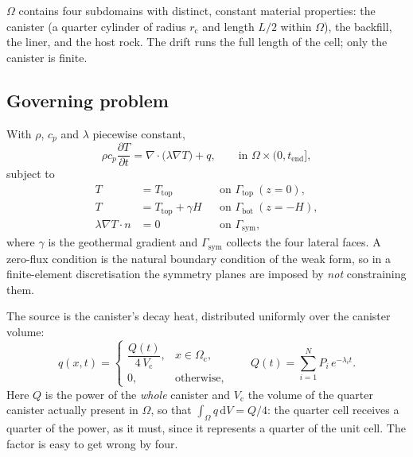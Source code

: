 \documentclass[11pt,a4paper]{article}
\theoremstyle{plain}
\newcommand{\Ttop}{T_{\mathrm{top}}}
\newcommand{\dd}{\,\mathrm{d}}
\begin{document}
$\Omega$ contains four subdomains with distinct, constant material properties:
the canister (a quarter cylinder of radius $r_{\mathrm{c}}$ and length $L/2$
within $\Omega$), the backfill, the liner, and the host rock. The drift runs the
full length of the cell; only the canister is finite.

\subsection{Governing problem}

With $\rho$, $c_p$ and $\lambda$ piecewise constant,
\begin{equation}
  \rho c_p \frac{\partial T}{\partial t}
    = \nabla\cdot\bigl(\lambda \nabla T\bigr) + q,
  \qquad \text{in } \Omega \times (0, t_{\mathrm{end}}],
  \label{eq:heat}
\end{equation}
subject to
\begin{equation}
  \begin{aligned}
    T &= \Ttop                  && \text{on } \Gamma_{\mathrm{top}} \ (z = 0),\\
    T &= \Ttop + \gamma H       && \text{on } \Gamma_{\mathrm{bot}} \ (z = -H),\\
    \lambda \nabla T \cdot n &= 0 && \text{on } \Gamma_{\mathrm{sym}},
  \end{aligned}
  \label{eq:bc}
\end{equation}
where $\gamma$ is the geothermal gradient and $\Gamma_{\mathrm{sym}}$ collects
the four lateral faces. A zero-flux condition is the natural boundary condition
of the weak form, so in a finite-element discretisation the symmetry planes are
imposed by \emph{not} constraining them.

The source is the canister's decay heat, distributed uniformly over the
canister volume:
\begin{equation}
  q(x,t) =
  \begin{cases}
    \dfrac{Q(t)}{4\,V_{\mathrm{c}}}, & x \in \Omega_{\mathrm{c}},\\[2ex]
    0, & \text{otherwise},
  \end{cases}
  \qquad
  Q(t) = \sum_{i=1}^{N} P_i\, e^{-\lambda_i t}.
  \label{eq:source}
\end{equation}
Here $Q$ is the power of the \emph{whole} canister and $V_{\mathrm{c}}$ the
volume of the quarter canister actually present in $\Omega$, so that
$\int_\Omega q \dd V = Q/4$: the quarter cell receives a quarter of the power,
as it must, since it represents a quarter of the unit cell. The factor is easy
to get wrong by four.
\end{document}
